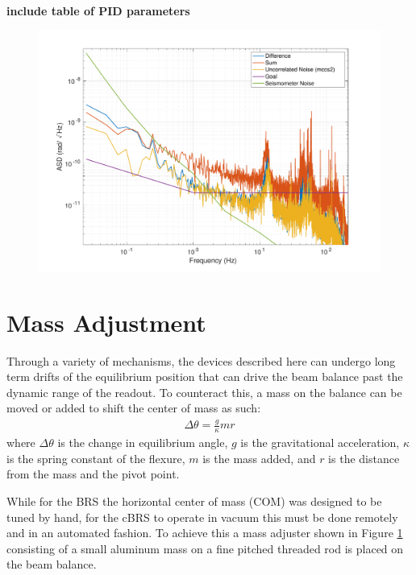 \documentclass [12pt, proquest]{uwthesis}[2019]
\begin{document}
\textbf{include table of PID parameters}

\begin{figure}%
\begin{center}
 \includegraphics[width=\textwidth]{cBRS_ReadoutNoise_11_19_19.pdf}
\caption{}
\label{cBRS_readout}
\end{center}
\end{figure}

\section{Mass Adjustment}

Through a variety of mechanisms, the devices described here can undergo long term drifts of the equilibrium position that can drive the beam balance past the dynamic range of the readout. To counteract this, a mass on the balance can be moved or added to shift the center of mass as such:
\begin{align}
\Delta \theta=\frac{g}{\kappa} m r
\end{align}
where $\Delta \theta$ is the change in equilibrium angle, $g$ is the gravitational acceleration, $\kappa$ is the spring constant of the flexure, $m$ is the mass added, and $r$ is the distance from the mass and the pivot point.

While for the BRS the horizontal center of mass (COM) was designed to be tuned by hand, for the cBRS to operate in vacuum this must be done remotely and in an automated fashion. To achieve this a mass adjuster shown in Figure \ref{} consisting of a small aluminum mass on a fine pitched threaded rod is placed on the beam balance.
\end{document}

